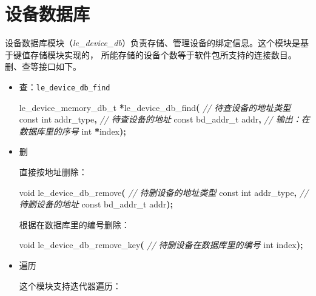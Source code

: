 \documentclass[
  12pt,
]{book}
\newenvironment{Shaded}{\begin{snugshade}}{\end{snugshade}}
\newcommand{\CommentTok}[1]{\textcolor[rgb]{0.56,0.35,0.01}{\textit{#1}}}
\newcommand{\DataTypeTok}[1]{\textcolor[rgb]{0.13,0.29,0.53}{#1}}
\newcommand{\NormalTok}[1]{#1}
\newcommand{\OperatorTok}[1]{\textcolor[rgb]{0.81,0.36,0.00}{\textbf{#1}}}
\begin{document}
\hypertarget{ch98-le-dev-db}{%
\section{设备数据库}\label{ch98-le-dev-db}}

设备数据库模块（\emph{le\_device\_db}）负责存储、管理设备的绑定信息。这个模块是基于键值存储模块实现的，
所能存储的设备个数等于软件包所支持的连接数目。删、查等接口如下。

\begin{itemize}
\item
  查：\texttt{le\_device\_db\_find}

\begin{Shaded}
\begin{Highlighting}[]
\NormalTok{le\_device\_memory\_db\_t }\OperatorTok{*}\NormalTok{le\_device\_db\_find}\OperatorTok{(}
  \CommentTok{// 待查设备的地址类型}
  \DataTypeTok{const} \DataTypeTok{int}\NormalTok{ addr\_type}\OperatorTok{,}
  \CommentTok{// 待查设备的地址}
  \DataTypeTok{const}\NormalTok{ bd\_addr\_t addr}\OperatorTok{,}
  \CommentTok{// 输出：在数据库里的序号}
  \DataTypeTok{int} \OperatorTok{*}\NormalTok{index}\OperatorTok{);}
\end{Highlighting}
\end{Shaded}
\item
  删

  直接按地址删除：

\begin{Shaded}
\begin{Highlighting}[]
\DataTypeTok{void}\NormalTok{ le\_device\_db\_remove}\OperatorTok{(}
  \CommentTok{// 待删设备的地址类型}
  \DataTypeTok{const} \DataTypeTok{int}\NormalTok{ addr\_type}\OperatorTok{,}
  \CommentTok{// 待删设备的地址}
  \DataTypeTok{const}\NormalTok{ bd\_addr\_t addr}\OperatorTok{);}
\end{Highlighting}
\end{Shaded}

  根据在数据库里的编号删除：

\begin{Shaded}
\begin{Highlighting}[]
\DataTypeTok{void}\NormalTok{ le\_device\_db\_remove\_key}\OperatorTok{(}
  \CommentTok{// 待删设备在数据库里的编号}
  \DataTypeTok{int}\NormalTok{ index}\OperatorTok{);}
\end{Highlighting}
\end{Shaded}
\item
  遍历

  这个模块支持迭代器遍历：


\end{itemize}
\end{document}
